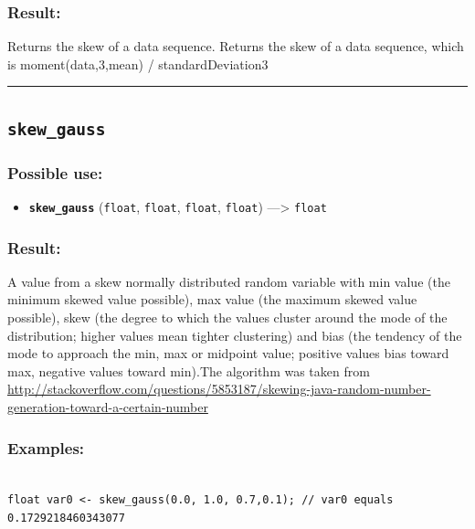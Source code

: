 \documentclass[]{book}
\providecommand{\tightlist}{%
  \setlength{\itemsep}{0pt}\setlength{\parskip}{0pt}}
\theoremstyle{definition}
\theoremstyle{definition}
\theoremstyle{definition}
\theoremstyle{remark}
\begin{document}
\subsubsection{Result:}\label{result-464}

Returns the skew of a data sequence. Returns the skew of a data
sequence, which is moment(data,3,mean) / standardDeviation3

\begin{center}\rule{0.5\linewidth}{\linethickness}\end{center}

\subsection{\texorpdfstring{\texttt{skew\_gauss}}{skew\_gauss}}\label{skew_gauss}

\subsubsection{Possible use:}\label{possible-use-481}

\begin{itemize}
\tightlist
\item
  \textbf{\texttt{skew\_gauss}} (\texttt{float}, \texttt{float},
  \texttt{float}, \texttt{float}) ---\textgreater{} \texttt{float}
\end{itemize}

\subsubsection{Result:}\label{result-465}

A value from a skew normally distributed random variable with min value
(the minimum skewed value possible), max value (the maximum skewed value
possible), skew (the degree to which the values cluster around the mode
of the distribution; higher values mean tighter clustering) and bias
(the tendency of the mode to approach the min, max or midpoint value;
positive values bias toward max, negative values toward min).The
algorithm was taken from
\url{http://stackoverflow.com/questions/5853187/skewing-java-random-number-generation-toward-a-certain-number}

\subsubsection{Examples:}\label{examples-336}

\begin{verbatim}
 
float var0 <- skew_gauss(0.0, 1.0, 0.7,0.1); // var0 equals 0.1729218460343077
\end{verbatim}
\end{document}
